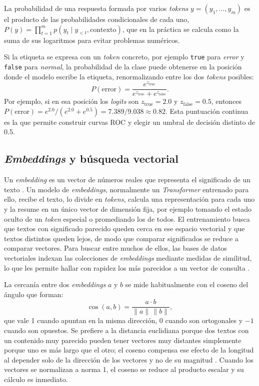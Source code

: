 La probabilidad de una respuesta formada por varios \textit{tokens} $y = (y_1, \ldots, y_m)$ es el producto de las probabilidades condicionales de cada uno, $P(y) = \prod_{t=1}^{m} p(y_t \mid y_{<t}, \text{contexto})$, que en la práctica se calcula como la suma de sus logaritmos para evitar problemas numéricos.

Si la etiqueta se expresa con un \textit{token} concreto, por ejemplo \texttt{true} para \emph{error} y \texttt{false} para \emph{normal}, la probabilidad de la clase puede obtenerse en la posición donde el modelo escribe la etiqueta, renormalizando entre los dos \textit{tokens} posibles:
\begin{equation}
P(\text{error}) = \frac{e^{z_{\text{true}}}}{e^{z_{\text{true}}} + e^{z_{\text{false}}}}.
\end{equation}
Por ejemplo, si en esa posición los \textit{logits} son $z_{\text{true}} = 2.0$ y $z_{\text{false}} = 0.5$, entonces $P(\text{error}) = e^{2.0}/(e^{2.0} + e^{0.5}) = 7.389/9.038 \approx 0.82$. Esta puntuación continua es la que permite construir curvas ROC y elegir un umbral de decisión distinto de 0.5.

\subsection{\textit{Embeddings} y búsqueda vectorial}\label{sec:mt_embeddings}

Un \textit{embedding} es un vector de números reales que representa el significado de un texto \cite{murphy2024_embeddings}. Un modelo de \textit{embeddings}, normalmente un \textit{Transformer} entrenado para ello, recibe el texto, lo divide en \textit{tokens}, calcula una representación para cada uno y la resume en un único vector de dimensión fija, por ejemplo tomando el estado oculto de un \textit{token} especial o promediando los de todos. El entrenamiento busca que textos con significado parecido queden cerca en ese espacio vectorial y que textos distintos queden lejos, de modo que comparar significados se reduce a comparar vectores. Para buscar entre muchos de ellos, las bases de datos vectoriales indexan las colecciones de \textit{embeddings} mediante medidas de similitud, lo que les permite hallar con rapidez los más parecidos a un vector de consulta \cite{fu2023_gptcache}.
    
La cercanía entre dos \textit{embeddings} $a$ y $b$ se mide habitualmente con el coseno del ángulo que forman:
\begin{equation}
\cos(a, b) = \frac{a \cdot b}{\lVert a \rVert \, \lVert b \rVert},
\end{equation}
que vale 1 cuando apuntan en la misma dirección, 0 cuando son ortogonales y $-1$ cuando son opuestos. Se prefiere a la distancia euclidiana porque dos textos con un contenido muy parecido pueden tener vectores muy distantes simplemente porque uno es más largo que el otro; el coseno compensa ese efecto de la longitud al depender solo de la dirección de los vectores y no de su magnitud \cite{manning2008_ir}. Cuando los vectores se normalizan a norma 1, el coseno se reduce al producto escalar y su cálculo es inmediato.

